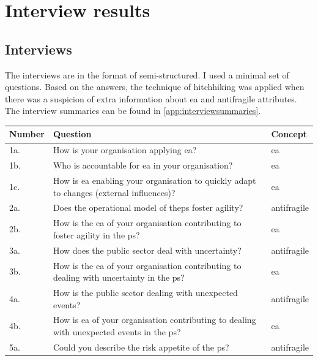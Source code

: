 \chapter{Interview results}
\label{ch:interviewresults}

\section{Interviews}
\label{sec:interviews}
The interviews are in the format of semi-structured. I used a minimal set of questions. Based on the answers, the technique of hitchhiking was applied when there was a suspicion of extra information about \acrshort{ea} and \gls{antifragile} attributes. The interview summaries can be found in \cref{app:interviewsummaries}.

\begin{table}[!h]
	\label{tab:interviewquestions}
	\begin{center}
			\begin{tabular}{@{}p{}p{}p{}@{}}
				\toprule
				\textbf{Number} & \textbf{Question} & \textbf{Concept} \\ \midrule %
				1a. & How is your organisation applying \acrshort{ea}? & \acrshort{ea} \\%
				1b. & Who is accountable for \acrshort{ea} in your organisation? & \acrshort{ea} \\%
				1c. & How is \acrshort{ea} enabling your organisation to quickly adapt to changes (external influences)? & \acrshort{ea} \\%
				2a. & Does the operational model of the\gls{ps} \gls{foster} \gls{agility}? & \Gls{antifragile} \\%
				2b. & How is the \acrshort{ea} of your organisation contributing to \gls{foster} \gls{agility} in the \gls{ps}? & \acrshort{ea} \\%
				3a. & How does the public sector deal with \gls{uncertainty}? & \Gls{antifragile} \\%
				3b. & How is the \acrshort{ea} of your organisation contributing to dealing with \gls{uncertainty} in the \gls{ps}?
				 & \acrshort{ea} \\%
				4a. & How is the public sector dealing with unexpected events? & \Gls{antifragile} \\%
				4b. & How is \acrshort{ea} of your organisation contributing to dealing with unexpected events in the \gls{ps}? & \acrshort{ea} \\%
				5a. & Could you describe the risk appetite of the \gls{ps}? & \Gls{antifragile} \\%

\end{tabular}
\end{center}
\end{table}
